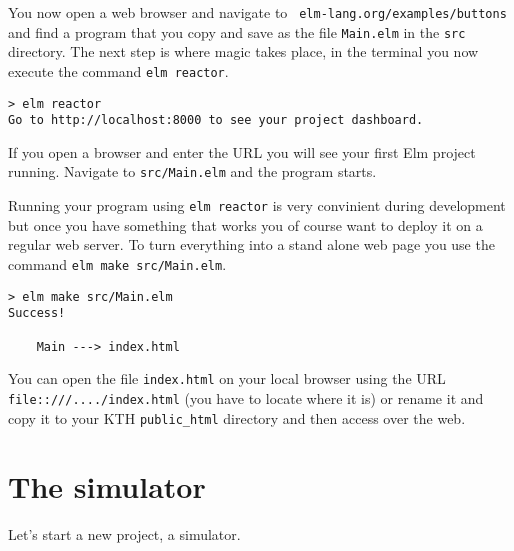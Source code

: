 \documentclass[a4paper,11pt]{article}
\begin{document}
You now open a web browser and navigate to {\tt
  elm-lang.org/examples/buttons} and find a program that you copy and
save as the file {\tt Main.elm} in the {\tt src} directory. The next
step is where magic takes place, in the terminal you now execute the
command {\tt elm reactor}.

\begin{verbatim}
> elm reactor
Go to http://localhost:8000 to see your project dashboard.
\end{verbatim}

If you open a browser and enter the URL you will see your first Elm
project running. Navigate to {\tt src/Main.elm} and the program
starts.

Running your program using {\tt elm reactor} is very convinient during
development but once you have something that works you of course want
to deploy it on a regular web server. To turn everything into a stand alone web page you use the command {\tt elm make src/Main.elm}.

\begin{verbatim}
> elm make src/Main.elm
Success!

    Main ---> index.html
\end{verbatim}

You can open the file {\tt index.html} on your local browser using the
URL {\tt file::///..../index.html} (you have to locate where it is) or
rename it and copy it to your KTH {\tt public_html} directory and then
access over the web. 


\section*{The simulator}

Let's start a new project, a simulator. 
\end{document}
